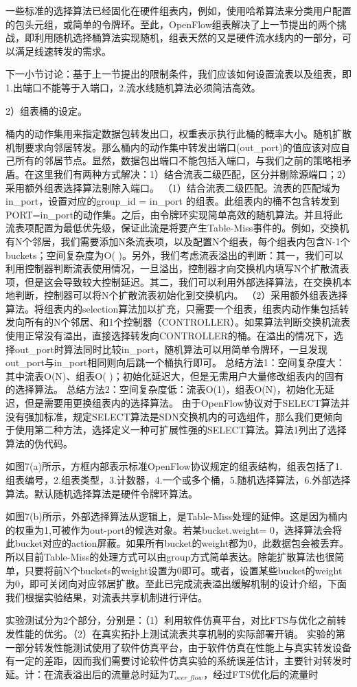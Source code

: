 一些标准的选择算法已经固化在硬件组表内，例如，使用哈希算法来分类用户配置的包头元组，或简单的令牌环。至此，OpenFlow组表解决了上一节提出的两个挑战，即利用随机选择桶算法实现随机，组表天然的又是硬件流水线内的一部分，可以满足线速转发的需求。

下一小节讨论：基于上一节提出的限制条件，我们应该如何设置流表以及组表，即1.出端口不能等于入端口，2.流水线随机算法必须简洁高效。


2）组表桶的设定。

桶内的动作集用来指定数据包转发出口，权重表示执行此桶的概率大小。随机扩散机制要求向邻居转发。那么桶内的动作集中转发出端口(out\_port)的值应该对应自己所有的邻居节点。显然，数据包出端口不能包括入端口，与我们之前的策略相矛盾。在这里我们有两种方式解决：1）结合流表二级匹配，区分并剔除源端口；2）采用额外组表选择算法剔除入端口。
（1）结合流表二级匹配。流表的匹配域为in\_port，设置对应的group\_id = in\_port 的组表。此组表内的桶不包含转发到PORT=in\_port的动作集。之后，由令牌环实现简单高效的随机算法。并且将此流表项配置为最低优先级，保证此流是将要产生Table-Miss事件的。例如，交换机有N个邻居，我们需要添加N条流表项，以及配置N个组表，每个组表内包含N-1个buckets；空间复杂度为O( )。另外，我们考虑流表溢出的判断：其一，我们可以利用控制器判断流表使用情况，一旦溢出，控制器才向交换机内填写N个扩散流表项，但是这会导致较大控制延迟。其二，我们可以利用外部选择算法，在交换机本地判断，控制器可以将N个扩散流表初始化到交换机内。
（2）采用额外组表选择算法。将组表内的selection算法加以扩充，只需要一个组表，组表内动作集包括转发向所有的N个邻居、和1个控制器（CONTROLLER）。如果算法判断交换机流表使用正常没有溢出，直接选择转发向CONTROLLER的桶。在溢出的情况下，选择out\_port时算法同时比较in\_port，随机算法可以用简单令牌环，一旦发现out\_port与in\_port相同则向后跳一个桶执行即可。
总结方法1：空间复杂度大：其中流表O(N)、组表O( )；初始化延迟大，但是无需用户大量修改组表内的固有的选择算法。
总结方法2：空间复杂度低：流表O(1)，组表O(N)，初始化无延迟，但是需要用更换组表内的选择算法。
由于OpenFlow协议对于SELECT算法并没有强加标准，规定SELECT算法是SDN交换机内的可选组件，那么我们更倾向于使用第二种方法，选择定义一种可扩展性强的SELECT算法。算法1列出了选择算法的伪代码。



如图7(a)所示，方框内部表示标准OpenFlow协议规定的组表结构，组表包括了1.组表编号，2.组表类型，3.计数器，4.一个或多个桶，5.随机选择算法，6.外部选择算法。默认随机选择算法是硬件令牌环算法。

如图7(b)所示，外部选择算法从逻辑上，是Table-Miss处理的延伸。这是因为桶内的权重为1,可被作为out-port的候选对象。若某bucket.weight= 0，选择算法会将此bucket对应的action屏蔽。如果所有bucket的weight都为0，此数据包会被丢弃。所以目前Table-Miss的处理方式可以由group方式简单表达。除能扩散算法也很简单，只要将前N个buckets的weight设置为0即可。或者，设置某些bucket的weight为0，即可关闭向对应邻居扩散。至此已完成流表溢出缓解机制的设计介绍，下面我们根据实验结果，对流表共享机制进行评估。






实验测试分为2个部分，分别是：（1）利用软件仿真平台，对比FTS与优化之前转发性能的优劣。（2）在真实拓扑上测试流表共享机制的实际部署开销。
实验的第一部分转发性能测试使用了软件仿真平台，由于软件仿真在性能上与真实转发设备有一定的差距，因而我们需要讨论软件仿真实验的系统误差估计，主要针对转发时延。计：在流表溢出后的流量总时延为$T_{over\_flow}$，经过FTS优化后的流量时




